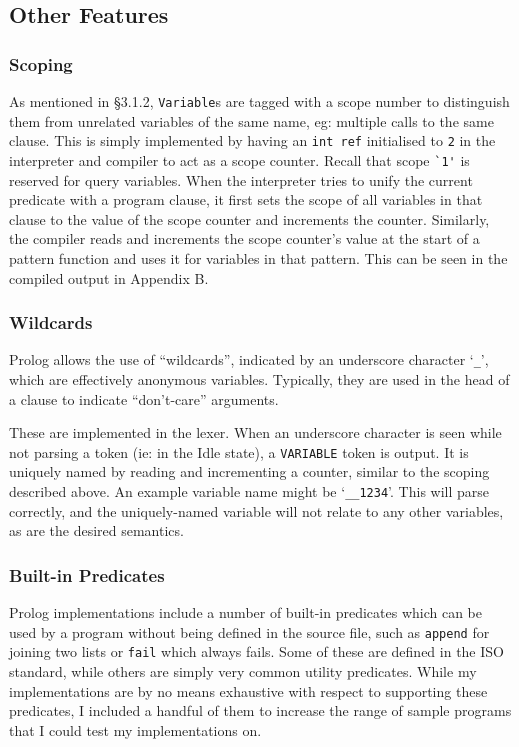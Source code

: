\documentclass[12pt]{article}
\begin{document}
\subsection{Other Features}

\subsubsection{Scoping}

As mentioned in \S3.1.2, \verb|Variable|s are tagged with a scope number to distinguish them from unrelated variables of the same name, eg: multiple calls to the same clause.
This is simply implemented by having an \verb|int ref| initialised to \verb|2| in the interpreter and compiler to act as a scope counter.
Recall that scope \verb|`1'| is reserved for query variables.
When the interpreter tries to unify the current predicate with a program clause, it first sets the scope of all variables in that clause to the value of the scope counter and increments the counter. 
Similarly, the compiler reads and increments the scope counter's value at the start of a pattern function and uses it for variables in that pattern.
This can be seen in the compiled output in Appendix B.

\subsubsection{Wildcards}

Prolog allows the use of ``wildcards'', indicated by an underscore character `\verb|_|', which are effectively anonymous variables. 
Typically, they are used in the head of a clause to indicate ``don't-care'' arguments. 

These are implemented in the lexer.
When an underscore character is seen while not parsing a token (ie: in the Idle state), a \verb|VARIABLE| token is output. 
It is uniquely named by reading and incrementing a counter, similar to the scoping described above.
An example variable name might be `\verb|__1234|'.
This will parse correctly, and the uniquely-named variable will not relate to any other variables, as are the desired semantics.

\subsubsection{Built-in Predicates}

Prolog implementations include a number of built-in predicates which can be used by a program without being defined in the source file, such as \verb|append| for joining two lists or \verb|fail| which always fails. 
Some of these are defined in the ISO standard, while others are simply very common utility predicates.
While my implementations are by no means exhaustive with respect to supporting these predicates, I included a handful of them to increase the range of sample programs that I could test my implementations on.
\end{document}
